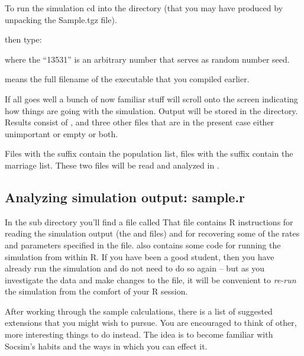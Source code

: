 To run the simulation cd into the  directory
(that you may have produced by unpacking the Sample.tgz file). 

then type:


where the ``13531'' is an arbitrary number that serves as random
number seed. 

 means the full filename of the executable that
you compiled earlier.


If all goes well a bunch of now familiar stuff will scroll onto the
screen indicating how things are going with the simulation.  Output
will be stored in the  directory.  Results consist of
,  and three
other files that are in the present case either unimportant or empty
or both.

Files with the  suffix contain the population list, files
with the  suffix contain the marriage list. These two files
will be read and analyzed in .



\subsection{Analyzing simulation output: sample.r}

In the sub directory  you'll find a file called
 That file contains R instructions for reading the
simulation output (the  and  files) and for
recovering some of the rates and parameters specified in the
 file.   also contains some code for running
the simulation from within R.  If you have been a good student, then
you have already run the simulation and do not need to do so again --
but as you investigate the data and make changes to the 
file, it will be convenient to \emph{re-run} the simulation from the
comfort of your R session.

After working through the sample calculations, there is a list of
suggested extensions that you might wish to pursue.  You are
encouraged to think of other, more interesting things to do instead.
The idea is to become familiar with Socsim's habits and the ways in
which you can effect it.  

